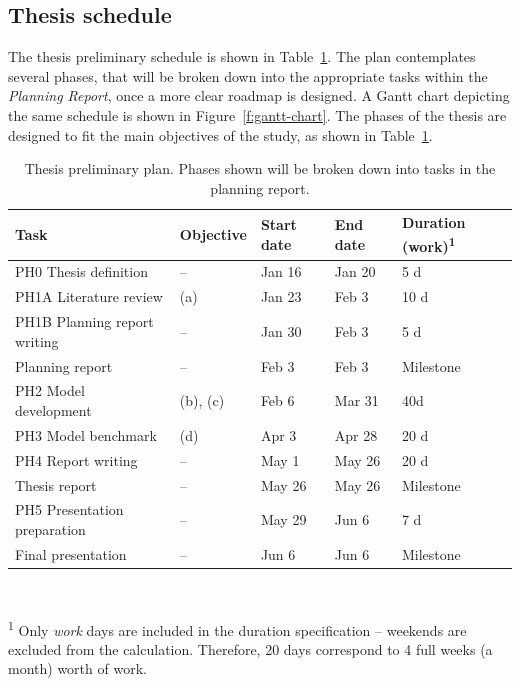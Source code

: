 \documentclass[a4paper,fontsize=10pt,bibliography=totoc]{scrartcl}
\newcommand{\fref}[1]{Figure~\ref{#1}}
\newcommand{\tref}[1]{Table~\ref{#1}}
\begin{document}
\begin{multicols}{2}
\section{Thesis schedule}
\label{s:schedule}
The thesis preliminary schedule is shown in \tref{t:schedule}. The plan contemplates several phases, that will be broken down into the appropriate tasks within the \textit{Planning Report}, once a more clear roadmap is designed. A Gantt chart depicting the same schedule is shown in \fref{f:gantt-chart}. The phases of the thesis are designed to fit the main objectives of the study, as shown in \tref{t:schedule}.

\printbibliography
\end{multicols}

\begin{table}[h!]
\centering
\footnotesize
\caption{Thesis preliminary plan. Phases shown will be broken down into tasks in the planning report.}
\label{t:schedule}
\begin{tabular}{lllll}
\toprule
Task & Objective & Start date & End date & Duration (work)\textsuperscript{1} \\
\midrule
PH0 Thesis definition & -- & Jan 16 & Jan 20 & 5 d \\
PH1A Literature review & (a) & Jan 23 & Feb 3 & 10 d \\
PH1B Planning report writing & -- & Jan 30 & Feb 3 & 5 d \\
Planning report & -- & Feb 3 & Feb 3 & Milestone \\
PH2 Model development & (b), (c) & Feb 6 & Mar 31 & 40d \\
PH3 Model benchmark & (d) & Apr 3 & Apr 28 & 20 d \\
PH4 Report writing & -- & May 1 & May 26 & 20 d \\
Thesis report & -- & May 26 & May 26 & Milestone \\
PH5 Presentation preparation & -- & May 29 & Jun 6 & 7 d \\
Final presentation & -- & Jun 6 & Jun 6 & Milestone \\
\bottomrule
\end{tabular}
{\\ \scriptsize \parbox{0.7\linewidth}{\textsuperscript{1} Only \textit{work} days are included in the duration specification -- weekends are excluded from the calculation. Therefore, 20 days correspond to 4 full weeks (a month) worth of work.}}
\end{table}
\end{document}
